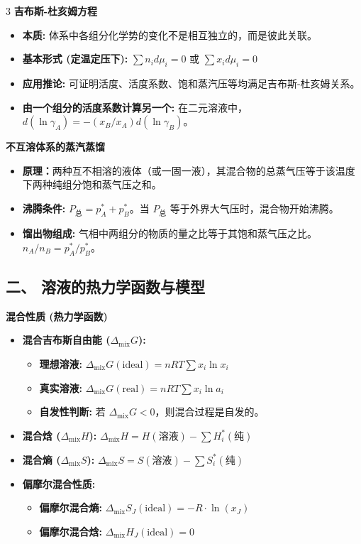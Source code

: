 \documentclass[a4paper,6pt]{article} %
\begin{document}
\begin{multicols}{3}
\textbf{吉布斯-杜亥姆方程}
\begin{itemize}
    \item \textbf{本质:} 体系中各组分化学势的变化不是相互独立的，而是彼此关联。
    \item \textbf{基本形式 (定温定压下):} $\sum n_i d\mu_i = 0$ 或 $\sum x_i d\mu_i = 0$
    \item \textbf{应用推论:} 可证明活度、活度系数、饱和蒸汽压等均满足吉布斯-杜亥姆关系。
    \item \textbf{由一个组分的活度系数计算另一个:} 在二元溶液中，$d(\ln \gamma_A) = -(x_B / x_A) d(\ln \gamma_B)$。
\end{itemize}

\textbf{不互溶体系的蒸汽蒸馏}
\begin{itemize}
    \item \textbf{原理：}两种互不相溶的液体（或一固一液），其混合物的总蒸气压等于该温度下两种纯组分饱和蒸气压之和。
    \item \textbf{沸腾条件:} $P_{\text{总}} = p_A^* + p_B^*$。当 $P_{\text{总}}$ 等于外界大气压时，混合物开始沸腾。
    \item \textbf{馏出物组成:} 气相中两组分的物质的量之比等于其饱和蒸气压之比。$n_A / n_B = p_A^* / p_B^*$。
\end{itemize}

\subsection*{二、 溶液的热力学函数与模型}
\textbf{混合性质 (热力学函数)}
\begin{itemize}
    \item \textbf{混合吉布斯自由能 ($\Delta_{\text{mix}}G$):}
    \begin{itemize}
        \item \textbf{理想溶液:} $\Delta_{\text{mix}}G(\text{ideal}) = nRT \sum x_i \ln x_i$
        \item \textbf{真实溶液:} $\Delta_{\text{mix}}G(\text{real}) = nRT \sum x_i \ln a_i$
        \item \textbf{自发性判断:} 若 $\Delta_{\text{mix}}G < 0$，则混合过程是自发的。
    \end{itemize}
    \item \textbf{混合焓 ($\Delta_{\text{mix}}H$):} $\Delta_{\text{mix}}H = H(\text{溶液}) - \sum H_i^*(\text{纯})$
    \item \textbf{混合熵 ($\Delta_{\text{mix}}S$):} $\Delta_{\text{mix}}S = S(\text{溶液}) - \sum S_i^*(\text{纯})$
    \item \textbf{偏摩尔混合性质:}
    \begin{itemize}
        \item \textbf{偏摩尔混合熵:} $\Delta_{\text{mix}}S_J(\text{ideal}) = -R \cdot \ln(x_J)$
        \item \textbf{偏摩尔混合焓:} $\Delta_{\text{mix}}H_J(\text{ideal}) = 0$
    \end{itemize}
\end{itemize}


\end{multicols}
\end{document}
